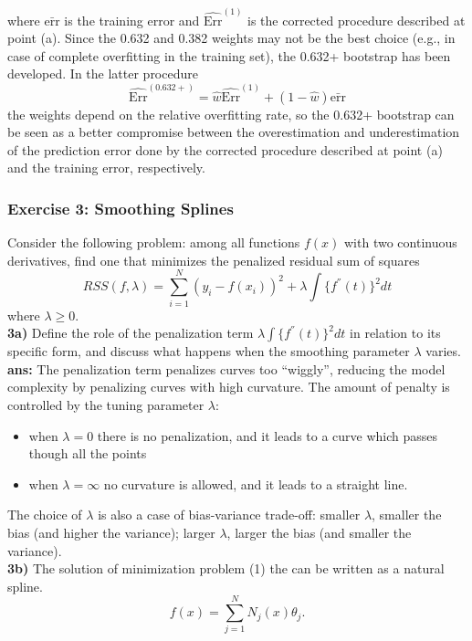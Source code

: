 \documentclass[a4paper, norsk, 8pt]{article}
\begin{document}
\begin{multicols*}{2}
where $\bar{\text{err}}$ is the training error and $\hat{\text{Err}}^(1)$ is the corrected procedure described at point (a). Since the 0.632 and 0.382 weights may not be the best choice (e.g., in case of complete overfitting in the training set), the 0.632+ bootstrap has been developed. In the latter procedure
\begin{equation}
	\hat{\text{Err}}^{(0.632+)} = \hat{w} \hat{\text{Err}}^{(1)} + (1-\hat{w})\bar{\text{err}}
\end{equation}
the weights depend on the relative overfitting rate, so the 0.632+ bootstrap can be seen as a better compromise between the overestimation and underestimation of the prediction error done by the corrected procedure described at point (a) and the training error, respectively.

\subsubsection*{\scriptsize Exercise 3: Smoothing Splines}
Consider the following problem: among all functions $f(x)$ with two continuous derivatives, find one that minimizes the penalized residual sum of squares
$$
RSS(f,\lambda)=\sum^N_{i=1}(y_i-f(x_i))^2 + \lambda \int \{f^{''}(t)\}^2dt
$$
where $\lambda\geq 0$.\\
\textbf{3a)} Define the role of the penalization term $\lambda \int \{f^{''}(t)\}^2dt$ in relation to its specific form, and discuss what happens when the smoothing parameter $\lambda$ varies.\\
\textbf{ans:} The penalization term penalizes curves too “wiggly”, reducing the model complexity by penalizing curves with high curvature. The amount of penalty is controlled by the tuning parameter $\lambda$:
\begin{itemize}
	\item when $\lambda=0$ there is no penalization, and it leads to a curve which passes though all the points
	\item when $\lambda = \infty$ no curvature is allowed, and it leads to a straight line.
\end{itemize}
The choice of $\lambda$ is also a case of bias-variance trade-off: smaller $\lambda$, smaller the bias (and higher the variance); larger $\lambda$, larger the bias (and smaller the variance).\\
\textbf{3b)} The solution of minimization problem (1) the can be written as a natural spline.
\begin{equation}\label{eq:1}
	f(x) = \sum^{N}_{j=1}N_j(x)\theta_j.

\end{equation}
\end{multicols*}
\end{document}
